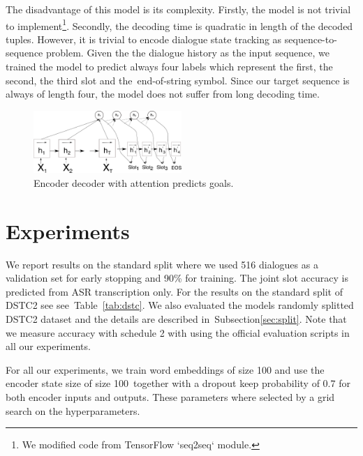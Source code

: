 \documentclass{itatnew}
\def\PB#1{\textcolor{red}{PB: \textit{#1}}}
\def\todo#1{\textcolor{purple}{todo: \textit{#1}}}
\begin{document}
The disadvantage of this model is its complexity.
Firstly, the model is not trivial to implement\footnote{We modified code from TensorFlow `seq2seq` module.}. Secondly, the decoding time is quadratic in length of the decoded tuples.
However, it is trivial to encode dialogue state tracking as sequence-to-sequence problem. Given the the dialogue history as the input sequence, we trained the model to predict always four labels which represent the first, the second, the third slot and the~end-of-string symbol.
Since our target sequence is always of length four, the model does not suffer from long decoding time. 
\begin{figure}
\includegraphics[width=0.5\textwidth]{encdec}
\caption{Encoder decoder with attention predicts goals.}
\label{fig:encdec}
\end{figure}

\section{Experiments}
\label{sec:exp}

We report results on the standard split where we used 516 dialogues as a validation set for early stopping\cite{prechelt1998early} and 90\% for training. The joint slot accuracy is predicted from ASR transcription only.
For the results on the standard split of DSTC2 see see~Table~\ref{tab:dstc}.
We also evaluated the models randomly splitted DSTC2 dataset and the details are described in~Subsection\ref{sec:split}.
Note that we measure accuracy with schedule 2 with using the official evaluation scripts in all our experiments.


For all our experiments, we train word embeddings of size 100 and use the encoder state size of size 100\, together with a dropout keep probability of $0.7$ for both encoder inputs and outputs.
These parameters where selected by a grid search on the hyperparameters.
\end{document}
